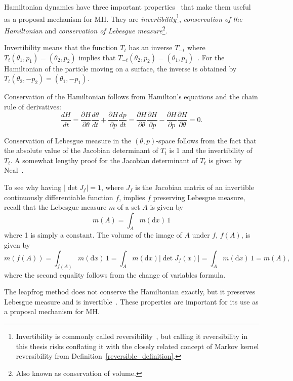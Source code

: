 \documentclass[english,twoside,openright]{HYgraduMLDS}
\newcommand{\dx}{\mathrm{d}}
\begin{document}
Hamiltonian dynamics have three important properties~\cite{neal2012mcmc} 
that make them useful as a
proposal mechanism for MH. They are \emph{invertibility}\footnote{
  Invertibility is commonly called reversibility~\cite{neal2012mcmc}, but
  calling it reversibility in this thesis risks conflating it with
  the closely related concept of Markov kernel reversibility from
  Definition~\ref{reversible_definition}.
},
\emph{conservation of the Hamiltonian} and
\emph{conservation of Lebesgue measure}\footnote{Also
  known as conservation of volume.
}.

Invertibility means that the function \(T_t\) has an inverse \(T_{-t}\) where
\(T_t(\theta_1, p_1) = (\theta_2, p_2)\) implies that
\(T_{-t}(\theta_2, p_2) = (\theta_1, p_1)\)~\cite{neal2012mcmc}.
For the Hamiltonian of the particle moving on a surface, the inverse 
is obtained by \(T_t(\theta_2, -p_2) = (\theta_1, -p_1)\).

Conservation of the Hamiltonian follows from Hamilton's equations and the 
chain rule of derivatives:
\[
    \frac{dH}{dt} = \frac{\partial H}{\partial \theta}\frac{d \theta}{dt}
    + \frac{\partial H}{\partial p}\frac{dp}{dt}
    = \frac{\partial H}{\partial \theta}\frac{\partial H}{\partial p}
    - \frac{\partial H}{\partial p}\frac{\partial H}{\partial \theta}
    = 0.
\]

Conservation of Lebesgue measure in the \((\theta, p)\)-space follows
from the fact that 
the absolute value of the Jacobian determinant of \(T_t\) is 1 and the 
invertibility of \(T_t\). A somewhat
lengthy proof for the Jacobian determinant of \(T_t\) is given by
Neal~\cite{neal2012mcmc}. 

To see why 
having \(|\det J_f| = 1\), where \(J_f\) is the Jacobian matrix of an invertible
continuously differentiable function \(f\), 
implies \(f\) preserving Lebesgue measure, recall that the Lebesgue measure
\(m\) of a set \(A\) is given by
\[
    m(A) = \int_A m(\dx x)\, 1
\]
where 1 is simply a constant.
The volume of the image of \(A\) under \(f\), \(f(A)\), is given by
\[
  m(f(A)) = \int_{f(A)}m(\dx x)\,1
  = \int_{A}m(\dx x)|\det J_f(x)| = \int_A m(\dx x)\,1
  = m(A),
\]
where the second equality follows from the change of variables formula.

The leapfrog method does not conserve the Hamiltonian exactly, but it 
preserves Lebesgue measure and is invertible~\cite{neal2012mcmc}.
These properties are important for its use as a proposal mechanism for MH.
\end{document}

